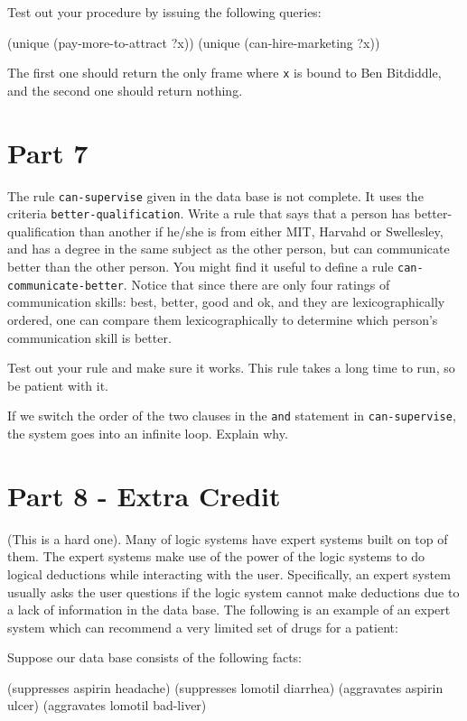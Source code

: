 Test out your procedure by issuing the following queries:

\beginlisp
(unique (pay-more-to-attract ?x))
\pbrk
(unique (can-hire-marketing ?x))
\endlisp

The first one should return the only frame where {\tt x} is bound to
Ben Bitdiddle, and the second one should return nothing.

\section{Part 7}

The rule {\tt can-supervise} given in the data base is not complete.
It uses the criteria {\tt better-qualification}.  Write a rule that
says that a person has better-qualification than another if he/she
is from either MIT, Harvahd or Swellesley, and has a degree in the
same subject as the other person, but can communicate better than
the other person.  You might find it useful to define a rule
{\tt can-communicate-better}.  Notice that since there are only
four ratings of communication skills: best, better, good and ok, and
they are lexicographically ordered, one can compare them lexicographically
to determine which person's communication skill is better.

Test out your rule and make sure it works.  This rule takes a long
time to run, so be patient with it.

If we switch the order of the two clauses in the {\tt and} statement
in {\tt can-supervise}, the system goes into an infinite loop.  Explain
why.

\section{Part 8 - Extra Credit}

(This is a hard one).  Many of logic systems have expert systems
built on top of them.  The expert systems make use of the power of the
logic systems to do logical deductions while interacting with the user.
Specifically, an expert system usually asks the user questions if the
logic system cannot make deductions due to a lack of information in the
data base.  The following is an example of an expert system which can
recommend a very limited set of drugs for a patient:

\vpar
Suppose our data base consists of the following facts:

\beginlisp
(suppresses aspirin headache)
(suppresses lomotil diarrhea)
(aggravates aspirin ulcer)
(aggravates lomotil bad-liver)
\endlisp

